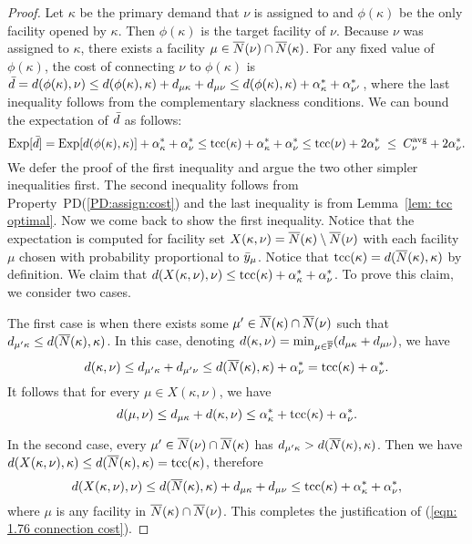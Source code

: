 \begin{proof}
  Let $\kappa$ be the primary demand that $\nu$ is assigned
  to and $\phi(\kappa)$ be the only facility opened by
  $\kappa$. Then $\phi(\kappa)$ is the target facility of
  $\nu$. Because $\nu$ was assigned to $\kappa$, there
  exists a facility $\mu\in {\overline{N}}(\nu)\cap {\overline{N}}(\kappa)$.
  For any fixed value of $\phi(\kappa)$, the cost of
  connecting $\nu$ to $\phi(\kappa)$ is ${\bar d} =
  d(\phi(\kappa),\nu) \le d(\phi(\kappa),\kappa)+
  d_{\mu\kappa}+d_{\mu\nu} \le
  d(\phi(\kappa),\kappa)+\alpha_{\kappa}^\ast +
  \alpha_{\nu'}^\ast$, where the last inequality follows
  from the complementary slackness conditions. We can bound
  the expectation of ${\bar d}$ as follows:
%
\begin{equation}
	\label{eqn: 1.76 connection cost}
  \mbox{\rm Exp}[{\bar d}] = \mbox{\rm Exp}[d(\phi(\kappa), \kappa)]  + \alpha_{\kappa}^\ast + \alpha_{\nu}^\ast
  \leq \textrm{tcc}(\kappa) + \alpha_{\kappa}^\ast + \alpha_{\nu}^\ast
  \leq \textrm{tcc}(\nu) + 2\alpha_{\nu}^\ast\;\leq\; C^{{\mbox{\scriptsize\rm avg}}}_{\nu} + 2\alpha_{\nu}^\ast.
\end{equation}
%
We defer the proof of the first inequality and argue the two
other simpler inequalities first. The second inequality
follows from Property~PD(\ref{PD:assign:cost}) and the last
inequality is from Lemma~\ref{lem: tcc optimal}. Now we come
back to show the first inequality. Notice that the
expectation is computed for facility set
$X(\kappa,\nu)={\overline{N}}(\kappa) \setminus {\overline{N}}(\nu)$ with
each facility $\mu$ chosen with probability proportional to
${\bar y}_{\mu}$. Notice that
$\textrm{tcc}(\kappa)=d({\overline{N}}(\kappa),\kappa)$ by definition. We
claim that $d(X(\kappa,\nu),\nu) \leq \textrm{tcc}(\kappa) +
\alpha_{\kappa}^\ast + \alpha_{\nu}^\ast$. To prove this
claim, we consider two cases.

 The first case is when there exists some $\mu'\in
{\overline{N}}(\kappa) \cap {\overline{N}}(\nu)$ such that $d_{\mu' \kappa}
\leq d({\overline{N}}(\kappa), \kappa)$. In this case, denoting
$d(\kappa, \nu)=\min_{\mu\in\overline{\mathbb{F}}} (d_{\mu\kappa} +
d_{\mu\nu})$, we have
\begin{equation*}
  d(\kappa,\nu)\leq
  d_{\mu'\kappa} + d_{\mu'\nu} \leq d({\overline{N}}(\kappa),\kappa) +
  \alpha_{\nu}^\ast=\textrm{tcc}(\kappa)+\alpha_{\nu}^\ast. 
\end{equation*}
It follows that for every $\mu\in X(\kappa,\nu)$, we have
\begin{equation*}
  d(\mu,\nu) \leq d_{\mu\kappa} + d(\kappa,\nu) \leq
  \alpha_{\kappa}^\ast + \textrm{tcc}(\kappa) + \alpha_{\nu}^\ast.
\end{equation*}

 In the second case, every $\mu'\in
{\overline{N}}(\nu)\cap {\overline{N}}(\kappa)$ has $d_{\mu'\kappa} >
d({\overline{N}}(\kappa),\kappa)$. Then we have
$d(X(\kappa,\nu),\kappa)\leq
d({\overline{N}}(\kappa),\kappa)=\textrm{tcc}(\kappa)$, therefore
\begin{equation*}
  d(X(\kappa,\nu), \nu) \leq d({\overline{N}}(\kappa), \kappa) +
  d_{\mu\kappa} + d_{\mu\nu} \leq \textrm{tcc}(\kappa) +
  \alpha_{\kappa}^\ast + \alpha_{\nu}^\ast,  
\end{equation*}
where $\mu$ is any facility in ${\overline{N}}(\kappa)\cap {\overline{N}}(\nu)$.
This completes the justification of (\ref{eqn: 1.76
  connection cost}).
\end{proof}

